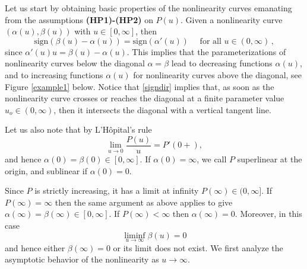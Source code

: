 \documentclass[reqno]{amsart}
\begin{document}
Let us start by obtaining basic properties of the nonlinearity curves emanating from the assumptions {\bf (HP1)-(HP2)} on $P(u)$. Given a nonlinearity curve $(\alpha(u),\beta(u))$ with $u\in [0,\infty]$, then
\begin{equation}\label{signdir}
\mbox{sign}(\beta(u)-\alpha(u))=\mbox{sign}(\alpha'(u))\quad \mbox{ for all } u\in (0,\infty)\,,
\end{equation}
since $\alpha'(u)u=\beta(u)-\alpha(u)$. This implies that the parameterizations of nonlinearity curves below the diagonal $\alpha=\beta$ lead to decreasing functions $\alpha(u)$, and to increasing functions $\alpha(u)$ for nonlinearity curves above the diagonal, see Figure \ref{example1} below. Notice that \eqref{signdir} implies that, as soon as the nonlinearity curve crosses or reaches the diagonal at a finite parameter value $u_o\in (0,\infty)$, then it intersects the diagonal with a vertical tangent line.

Let us also note that by L'H\^{o}pital's rule
\begin{equation}\label{limatzero}
\lim_{u\to 0} \frac{P(u)}{u}=P'(0+),
\end{equation}
and hence $\alpha(0)=\beta(0)\in [0,\infty]$. If $\alpha(0)=\infty$, we call $P$ superlinear at the origin, and sublinear if $\alpha(0)=0$.

Since $P$ is strictly increasing, it has a limit at infinity $P(\infty)\in (0,\infty]$. If $P(\infty)=\infty$ then the same argument as above applies to give $\alpha(\infty)=\beta(\infty)\in [0,\infty]$. If $P(\infty)<\infty$ then $\alpha(\infty)=0$. Moreover, in this case
$$
\liminf_{u\to\infty} \beta(u)=0
$$
and hence either $\beta(\infty)=0$ or its limit does not exist. We first analyze the asymptotic behavior of the nonlinearity as $u\to\infty$.
\end{document}
